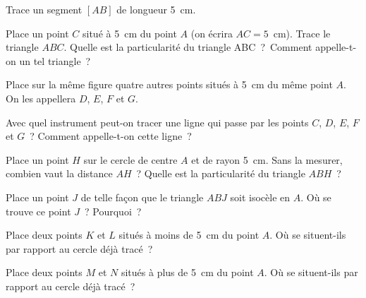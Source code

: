 \begin{myenumerate}
  \item Trace un segment $[AB]$ de longueur 5~cm.
  \item Place un point $C$ situé à 5~cm du point $A$ (on écrira
    $AC=5$~cm). Trace le triangle $ABC$. Quelle est la particularité
    du triangle ABC ? Comment appelle-t-on un tel triangle ?
  \item Place sur la même figure quatre autres points situés à 5~cm du
    même point $A$. On les appellera $D$, $E$, $F$ et $G$.\par Avec
    quel instrument peut-on tracer une ligne qui passe par les points
    $C$, $D$, $E$, $F$ et $G$ ? Comment appelle-t-on cette ligne ?
  \item Place un point $H$ sur le cercle de centre $A$ et de rayon
    5~cm. Sans la mesurer, combien vaut la distance $AH$ ? Quelle est
    la particularité du triangle $ABH$ ?
  \item Place un point $J$ de telle façon que le triangle $ABJ$ soit
    isocèle en $A$. Où se trouve ce point $J$ ? Pourquoi ?
  \item Place deux points $K$ et $L$ situés à moins de 5~cm du point
    $A$. Où se situent-ils par rapport au cercle déjà tracé ?
  \item Place deux points $M$ et $N$ situés à plus de 5~cm du point
    $A$. Où se situent-ils par rapport au cercle déjà tracé ?
\end{myenumerate}